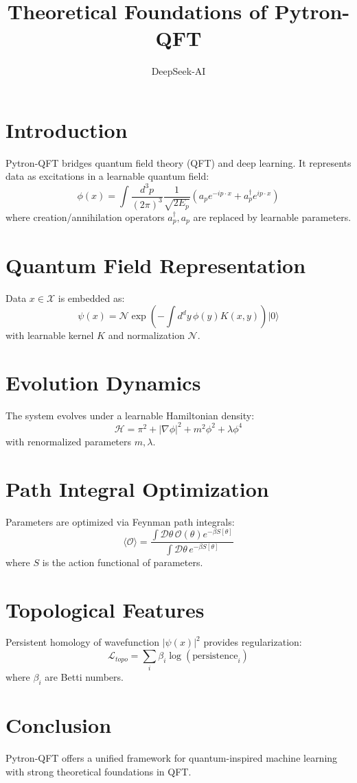 \documentclass{article}
\title{Theoretical Foundations of Pytron-QFT}
\author{DeepSeek-AI}
\begin{document}
\maketitle

\section{Introduction}
Pytron-QFT bridges quantum field theory (QFT) and deep learning. It represents data as excitations in a learnable quantum field:
\[
\phi(x) = \int \frac{d^3p}{(2\pi)^3} \frac{1}{\sqrt{2E_p}} \left( a_p e^{-ip\cdot x} + a_p^\dagger e^{ip\cdot x} \right)
\]
where creation/annihilation operators $a_p^\dagger, a_p$ are replaced by learnable parameters.

\section{Quantum Field Representation}
Data $x\in\mathcal{X}$ is embedded as:
\[
\psi(x) = \mathcal{N} \exp\left(-\int d^d y\, \phi(y) K(x,y) \right) |0\rangle
\]
with learnable kernel $K$ and normalization $\mathcal{N}$.

\section{Evolution Dynamics}
The system evolves under a learnable Hamiltonian density:
\[
\mathcal{H} = \pi^2 + |\nabla\phi|^2 + m^2\phi^2 + \lambda \phi^4
\]
with renormalized parameters $m, \lambda$.

\section{Path Integral Optimization}
Parameters are optimized via Feynman path integrals:
\[
\langle \mathcal{O} \rangle = \frac{\int \mathcal{D}\theta\, \mathcal{O}(\theta) e^{-\beta S[\theta]}}{\int \mathcal{D}\theta\, e^{-\beta S[\theta]}}
\]
where $S$ is the action functional of parameters.

\section{Topological Features}
Persistent homology of wavefunction $|\psi(x)|^2$ provides regularization:
\[
\mathcal{L}_{topo} = \sum_i \beta_i \log(\text{persistence}_i)
\]
where $\beta_i$ are Betti numbers.

\section{Conclusion}
Pytron-QFT offers a unified framework for quantum-inspired machine learning with strong theoretical foundations in QFT.
\end{document}

